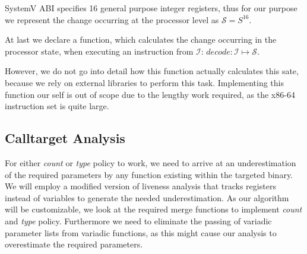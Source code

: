 SystemV ABI specifies 16 general purpose integer registers, thus for our purpose we represent the change occurring at the processor level as $\mathcal{S} = S^{16}$.

At last we declare a function, which calculates the change occurring in the processor state, when executing an instruction from $\mathcal{I}$:
$decode : \mathcal{I} \mapsto \mathcal{S}$.

However, we do not go into detail how this function actually calculates this sate, because we rely on external libraries to perform this task. Implementing this function our self is out of scope due to the lengthy work required, as the x86-64 instruction set is quite large.
    
\subsection{Calltarget Analysis}
\label{section:calltargetanalysis}
For either \emph{count} or \emph{type} policy to work, we need to arrive at an underestimation of the required parameters by any function existing within the targeted 
binary. We will employ a modified version of liveness analysis that tracks registers instead of variables to generate the needed underestimation. As our algorithm will 
be customizable, we look at the required merge functions to implement \emph{count} and \emph{type} policy. Furthermore we need to eliminate the passing of variadic 
parameter lists from variadic functions, as this might cause our analysis to overestimate the required parameters.

